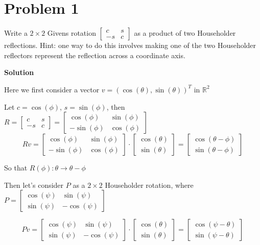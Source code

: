 \documentclass[12pt,oneside,a4paper]{article}
\newcommand{\problem}[1]
{
    \clearpage
    \section*{Problem {#1}}
}
\newcommand{\solution}
{
    \vspace{15pt}
    \noindent\ignorespaces\textbf{\large Solution}\par
}
\begin{document}
\problem{1}
Write a $2 \times 2$ Givens rotation $\begin{bmatrix}
c & s\\
-s & c
\end{bmatrix}$ as a product of two Householder reflections. Hint: one way to do this involves making one of the two Householder reflectors represent the reflection across a coordinate axis.

\solution
Here we first consider a vector $v = (\cos(\theta),\sin(\theta))^{T}$ in $\mathbb{R}^{2}$

Let $c = \cos(\phi)$, $s = \sin(\phi)$, then $R = \begin{bmatrix}
c & s\\
-s & c
\end{bmatrix} = \begin{bmatrix}
\cos(\phi) & \sin(\phi)\\
-\sin(\phi) & \cos(\phi)
\end{bmatrix}$
$$Rv = \begin{bmatrix}
\cos(\phi) & \sin(\phi)\\
-\sin(\phi) & \cos(\phi)
\end{bmatrix} \cdot \begin{bmatrix}
\cos(\theta)\\
\sin(\theta)
\end{bmatrix} = \begin{bmatrix}
\cos(\theta-\phi)\\
\sin(\theta-\phi)
\end{bmatrix}$$

So that $R(\phi): \theta \rightarrow \theta - \phi$

Then let's consider $P$ as a $2 \times 2$ Householder rotation, where $P = \begin{bmatrix}
\cos(\psi) & \sin(\psi)\\
\sin(\psi) & -\cos(\psi)
\end{bmatrix}$

$$Pv = \begin{bmatrix}
\cos(\psi) & \sin(\psi)\\
\sin(\psi) & -\cos(\psi)
\end{bmatrix} \cdot \begin{bmatrix}
\cos(\theta)\\
\sin(\theta)
\end{bmatrix} = \begin{bmatrix}
\cos(\psi - \theta)\\
\sin(\psi - \theta)
\end{bmatrix}
$$
\end{document}
